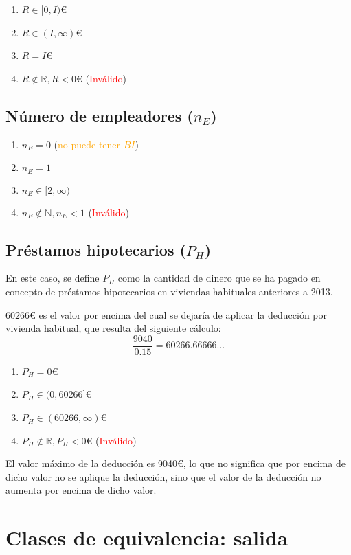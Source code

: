 \begin{enumerate}
	\item $R \in [0, I)$€
	\item $R \in (I, \infty)$€
	\item $R = I$€
	\item $R \notin \mathbb{R}, R < 0$€ (\textcolor{red}{Inválido})
\end{enumerate}

\subsection{Número de empleadores ($n_{E}$)}
\begin{enumerate}
	\item $n_{E} = 0$ (\textcolor{orange}{no puede tener $BI$})
	\item $n_{E} = 1$
	\item $n_{E} \in [2, \infty)$
	\item $n_{E} \notin \mathbb{N}, n_{E} < 1$ (\textcolor{red}{Inválido})
\end{enumerate}

\subsection{Préstamos hipotecarios ($P_{H}$)}
En este caso, se define $P_{H}$ como la cantidad de dinero que se ha pagado
en concepto de préstamos hipotecarios en viviendas habituales anteriores a 2013.

$60266$€ es el valor por encima del cual se dejaría de aplicar la deducción por vivienda habitual,
que resulta del siguiente cálculo: $$\frac{9040}{0.15} = 60266.66666\dots$$

\begin{enumerate}
	\item $P_{H} = 0$€
	\item $P_{H} \in (0, 60266]$€
	\item $P_{H} \in (60266, \infty)$€
	\item $P_{H} \notin \mathbb{R}, P_{H} < 0$€ (\textcolor{red}{Inválido})
\end{enumerate}

El valor máximo de la deducción es 9040€, lo que no significa que por encima de dicho valor no se aplique
la deducción, sino que el valor de la deducción no aumenta por encima de dicho valor.

\newpage{}
\section{Clases de equivalencia: salida}
